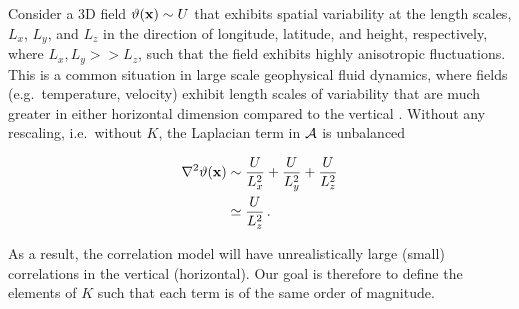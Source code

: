 Consider a 3D field $\vartheta(\mathbf{x})\sim U$ that exhibits spatial variability at the
length scales, $L_x$, $L_y$, and $L_z$ in the direction of longitude, latitude,
and height, respectively,
where $L_x, L_y >> L_z$, such that the field exhibits highly
anisotropic fluctuations.
This is a common situation in large scale geophysical fluid
dynamics, where fields (e.g.\ temperature, velocity) exhibit length scales of
variability that are much greater in either horizontal dimension compared to the
vertical \citep[e.g.][]{vallis2006}.
Without any rescaling, i.e.\ without $K$,
the Laplacian term in $\mathcal{A}$ is unbalanced
\begin{linenomath*}\begin{equation}
    \begin{aligned}
        \nabla^2 \vartheta(\mathbf{x})
            & \sim \dfrac{U}{L_x^2} + \dfrac{U}{L_y^2} + \dfrac{U}{L_z^2} \\
            & \simeq \dfrac{U}{L_z^2} \, .
    \end{aligned}
    \label{eq:iso_lap}
\end{equation}\end{linenomath*}
As a result, the correlation model will
have unrealistically large (small) correlations in the vertical (horizontal).
Our goal is therefore to define the elements of $K$ such that each term is of
the same order of magnitude.

